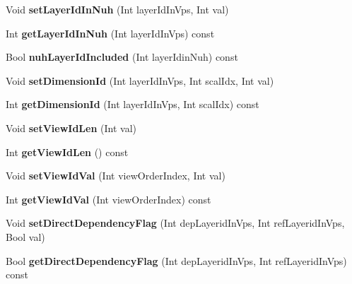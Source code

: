 \begin{DoxyCompactItemize}
Void {\bfseries set\+Layer\+Id\+In\+Nuh} (Int layer\+Id\+In\+Vps, Int val)
\item 
\mbox{\label{class_t_com_v_p_s_a3eaf7e8a2c8ede2637840138c389c3ec}} 
Int {\bfseries get\+Layer\+Id\+In\+Nuh} (Int layer\+Id\+In\+Vps) const
\item 
\mbox{\label{class_t_com_v_p_s_a3a1e5b419fae04711371118a17616de8}} 
Bool {\bfseries nuh\+Layer\+Id\+Included} (Int layer\+Idin\+Nuh) const
\item 
\mbox{\label{class_t_com_v_p_s_a6c4f0fe19df71d5e0bbf0fbe9c25198a}} 
Void {\bfseries set\+Dimension\+Id} (Int layer\+Id\+In\+Vps, Int scal\+Idx, Int val)
\item 
\mbox{\label{class_t_com_v_p_s_a770ce6b3ca6c4a73941c2835e6930fa3}} 
Int {\bfseries get\+Dimension\+Id} (Int layer\+Id\+In\+Vps, Int scal\+Idx) const
\item 
\mbox{\label{class_t_com_v_p_s_aaf65df925d09da364aa24455db1e013a}} 
Void {\bfseries set\+View\+Id\+Len} (Int val)
\item 
\mbox{\label{class_t_com_v_p_s_ab1998c18679d02c1fcbfd42b2c97d425}} 
Int {\bfseries get\+View\+Id\+Len} () const
\item 
\mbox{\label{class_t_com_v_p_s_a6c1034db4f83e2e2c0bafaa4f77bb295}} 
Void {\bfseries set\+View\+Id\+Val} (Int view\+Order\+Index, Int val)
\item 
\mbox{\label{class_t_com_v_p_s_aaa0a8deaad7bb3d51217e07303e697ab}} 
Int {\bfseries get\+View\+Id\+Val} (Int view\+Order\+Index) const
\item 
\mbox{\label{class_t_com_v_p_s_ab9fdaee86569993384bc64d033f8ff3e}} 
Void {\bfseries set\+Direct\+Dependency\+Flag} (Int dep\+Layerid\+In\+Vps, Int ref\+Layerid\+In\+Vps, Bool val)
\item 
\mbox{\label{class_t_com_v_p_s_a7232454fd5c0b072271223139fc96525}} 
Bool {\bfseries get\+Direct\+Dependency\+Flag} (Int dep\+Layerid\+In\+Vps, Int ref\+Layerid\+In\+Vps) const

\end{DoxyCompactItemize}
